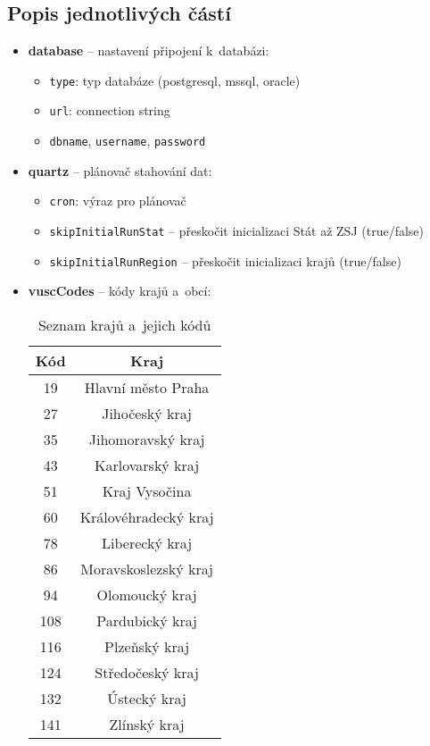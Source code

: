 \newpage

\subsection*{Popis jednotlivých částí}
\begin{itemize}
  \item \textbf{database} -- nastavení připojení k~databázi:
  \begin{itemize}
    \item \texttt{type}: typ databáze (postgresql, mssql, oracle)
    \item \texttt{url}: connection string
    \item \texttt{dbname}, \texttt{username}, \texttt{password}
  \end{itemize}

  \item \textbf{quartz} -- plánovač stahování dat:
  \begin{itemize}
    \item \texttt{cron}: výraz pro plánovač
    \item \texttt{skipInitialRunStat} -- přeskočit inicializaci Stát až ZSJ (true/false)
    \item \texttt{skipInitialRunRegion} -- přeskočit inicializaci krajů (true/false)
  \end{itemize}

  \item \textbf{vuscCodes} -- kódy krajů a~obcí:
  \begin{longtable}{|c|c|}
    \caption{Seznam krajů a~jejich kódů} \\
    \hline
    \textbf{Kód} & \textbf{Kraj} \\
    \hline
    19 & Hlavní město Praha \\
    27 & Jihočeský kraj \\
    35 & Jihomoravský kraj \\
    43 & Karlovarský kraj \\
    51 & Kraj Vysočina \\
    60 & Královéhradecký kraj \\
    78 & Liberecký kraj \\
    86 & Moravskoslezský kraj \\
    94 & Olomoucký kraj \\
    108 & Pardubický kraj \\
    116 & Plzeňský kraj \\
    124 & Středočeský kraj \\
    132 & Ústecký kraj \\
    141 & Zlínský kraj \\
    \hline
  \end{longtable}


\end{itemize}
